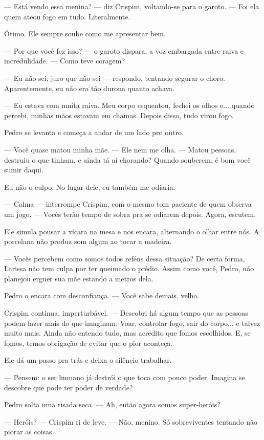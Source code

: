 — Está vendo essa menina? — diz Crispim, voltando-se para o garoto. — Foi ela quem ateou fogo em tudo. Literalmente.

Ótimo. Ele sempre soube como me apresentar bem.

— Por que você fez isso? — o garoto dispara, a voz embargada entre raiva e incredulidade. — Como teve coragem?

— Eu não sei, juro que não sei — respondo, tentando segurar o choro.  
Aparentemente, eu não era tão durona quanto achava.

— Eu estava com muita raiva. Meu corpo esquentou, fechei os olhos e... quando percebi, minhas mãos estavam em chamas. Depois disso, tudo virou fogo.

Pedro se levanta e começa a andar de um lado pro outro.

— Você quase matou minha mãe. — Ele nem me olha.  
— Matou pessoas, destruiu o que tinham, e ainda tá aí chorando?  
Quando souberem, é bom você sumir daqui.

Eu não o culpo.  
No lugar dele, eu também me odiaria.

— Calma — interrompe Crispim, com o mesmo tom paciente de quem observa um jogo. — Vocês terão tempo de sobra pra se odiarem depois. Agora, escutem.

Ele simula pousar a xícara na mesa e nos encara, alternando o olhar entre nós. A porcelana não produz som algum ao tocar a madeira.

— Vocês percebem como somos todos reféns dessa situação?  
De certa forma, Larissa não tem culpa por ter queimado o prédio.  
Assim como você, Pedro, não planejou erguer sua mãe estando a metros dela.

Pedro o encara com desconfiança.  
— Você sabe demais, velho.

Crispim continua, imperturbável.  
— Descobri há algum tempo que as pessoas podem fazer mais do que imaginam.  
Voar, controlar fogo, sair do corpo... e talvez muito mais.  
Ainda não entendo tudo, mas acredito que fomos escolhidos.  
E, se fomos, temos obrigação de evitar que o pior aconteça.

Ele dá um passo pra trás e deixa o silêncio trabalhar.

— Pensem: o ser humano já destrói o que toca com pouco poder.  
Imagina se descobre que pode ter poder de verdade?

Pedro solta uma risada seca.  
— Ah, então agora somos super-heróis?

— Heróis? — Crispim ri de leve. — Não, menino. Só sobreviventes tentando não piorar as coisas.


